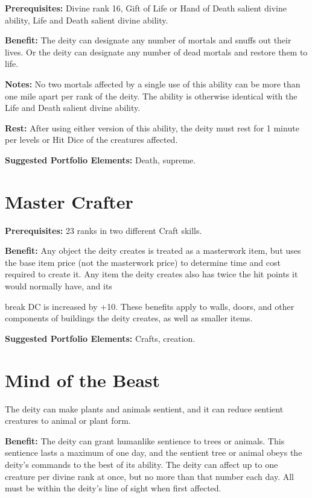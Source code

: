 \documentclass{article}
\begin{document}
\textbf{Prerequisites:} Divine rank 16, Gift of Life or Hand of Death salient divine 
ability, Life and Death salient divine ability.

\textbf{Benefit:} The deity can designate any number of mortals and snuffs out 
their lives. Or the deity can designate any number of dead mortals and restore 
them to life.

\textbf{Notes:} No two mortals affected by a single use of this ability can be 
more than one mile apart per rank of the deity. The ability is otherwise identical 
with the Life and Death salient divine ability.

\textbf{Rest: }After using either version of this ability, the deity must rest 
for 1 minute per levels or Hit Dice of the creatures affected.

\textbf{Suggested Portfolio Elements:} Death, supreme.

\vspace{12pt}
\section*{Master Crafter}

\textbf{Prerequisites:} 23 ranks in two different Craft skills.

\textbf{Benefit:} Any object the deity creates is treated as a masterwork item, 
but uses the base item price (not the masterwork price) to determine time and cost 
required to create it. Any item the deity creates also has twice the hit points 
it would normally have, and its

break DC is increased by +10. These benefits apply to walls, doors, and other components 
of buildings the deity creates, as well as smaller items.

\textbf{Suggested Portfolio Elements:} Crafts, creation.

\vspace{12pt}
\section*{Mind of the Beast}

The deity can make plants and animals sentient, and it can reduce sentient creatures 
to animal or plant form.

\textbf{Benefit:} The deity can grant humanlike sentience to trees or animals. 
This sentience lasts a maximum of one day, and the sentient tree or animal obeys 
the deity's commands to the best of its ability. The deity can affect up to one 
creature per divine rank at once, but no more than that number each day. All must 
be within the deity's line of sight when first affected.
\end{document}
